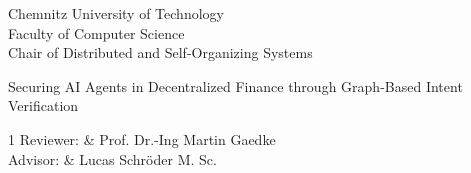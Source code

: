 %
%
\begin{tuctitlepage}
\begin{tuctitleorgunit}
Chemnitz University of Technology \\
Faculty of Computer Science \\
Chair of Distributed and Self-Organizing Systems \\
\end{tuctitleorgunit}

\tuctitlelogo

\bigskip
{}
\bigskip
{}

\vspace*{0pt plus 2fill}
\begin{tuctitletopic}
Securing AI Agents in Decentralized Finance through Graph-Based Intent Verification
\end{tuctitletopic}
\vspace*{0pt plus 2fill}

\begin{tuctitletable}[\bfseries]{1}
Reviewer: & Prof. Dr.-Ing Martin Gaedke \\
Advisor:  & Lucas Schröder M. Sc.\\
\end{tuctitletable}

\vspace*{0pt plus 1fill}

\end{tuctitlepage}